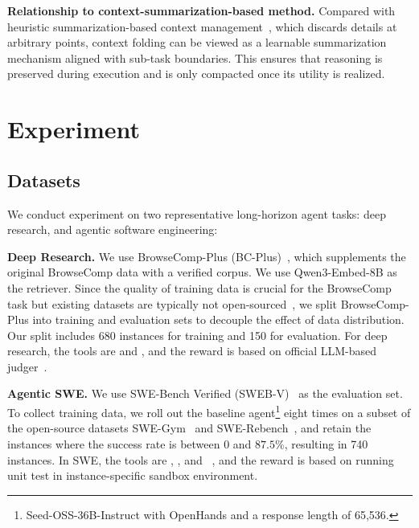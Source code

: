\textbf{Relationship to context-summarization-based method.}
Compared with heuristic summarization-based context management~\citep{Yu2025MemAgentRL,OpenAI2025a}, which discards details at arbitrary points, context folding can be viewed as a learnable summarization mechanism aligned with sub-task boundaries. 
This ensures that reasoning is preserved during execution and is only compacted once its utility is realized.



\section{Experiment}

\subsection{Datasets}
We conduct experiment on two representative long-horizon agent tasks: deep research, and agentic software engineering:

\noindent \textbf{Deep Research.}
We use BrowseComp-Plus (BC-Plus)~\citep{Chen2025BrowseCompPlusAM}, which supplements the original BrowseComp data with a verified corpus. 
We use Qwen3-Embed-8B as the retriever.
Since the quality of training data is crucial for the BrowseComp task but existing datasets are typically not open-sourced~\citep{Qiao2025WebResearcherUU,Li2025WebSailorV2BT}, we split BrowseComp-Plus into training and evaluation sets to decouple the effect of data distribution. 
Our split includes 680 instances for training and 150 for evaluation. 
For deep research, the tools are  and , and the reward is based on official LLM-based judger~\citep{Chen2025BrowseCompPlusAM}.



\noindent \textbf{Agentic SWE.} 
We use SWE-Bench Verified (SWEB-V)~\citep{Jimenez2023SWEbenchCL} as the evaluation set. 
To collect training data, we roll out the baseline agent\footnote{Seed-OSS-36B-Instruct with OpenHands and a response length of 65,536.} eight times on a subset of the open-source datasets SWE-Gym~\citep{Pan2024TrainingSE} and SWE-Rebench~\citep{Badertdinov2025SWErebenchAA}, and retain the instances where the success rate is between 0 and $87.5\%$, resulting in 740 instances. 
In SWE, the tools are , , and ~\citep{Wang2024OpenHandsAO}, and the reward is based on running unit test in instance-specific sandbox environment.

